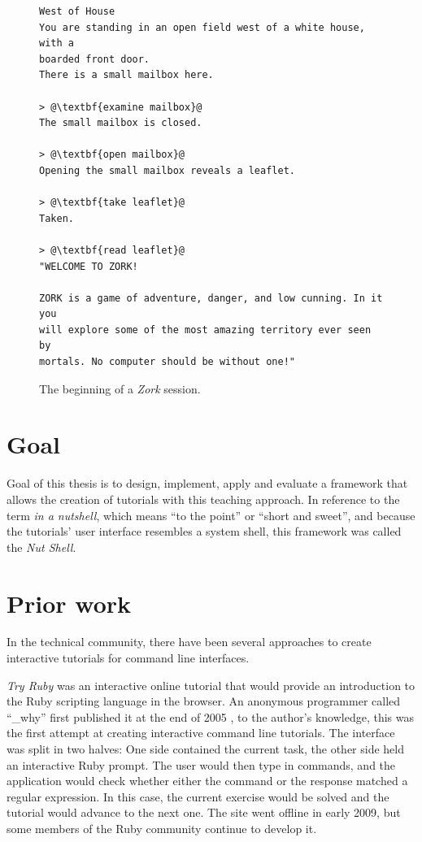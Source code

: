 \documentclass[paper=a4,twoside,abstract=on,cleardoublepage=empty,numbers=noenddot,toc=bib,12pt,appendixprefix=true]{scrreprt}
\begin{document}
\begin{figure}[tb]
    \begin{lstlisting}[escapechar=@,frame=shadowbox]
West of House
You are standing in an open field west of a white house, with a
boarded front door.
There is a small mailbox here.

> @\textbf{examine mailbox}@
The small mailbox is closed.

> @\textbf{open mailbox}@
Opening the small mailbox reveals a leaflet.

> @\textbf{take leaflet}@
Taken.

> @\textbf{read leaflet}@
"WELCOME TO ZORK!

ZORK is a game of adventure, danger, and low cunning. In it you
will explore some of the most amazing territory ever seen by
mortals. No computer should be without one!"
    \end{lstlisting}
    \centering
    \caption{The beginning of a \emph{Zork} session.}
    \label{fig:zork}
\end{figure}

\section{Goal}

Goal of this thesis is to design, implement, apply and evaluate a framework that allows the creation of tutorials with this teaching approach. In reference to the term \emph{in a nutshell}, which means “to the point” or “short and sweet”, and because the tutorials' user interface resembles a system shell, this framework was called the \emph{Nut Shell}.

\section{Prior work}

In the technical community, there have been several approaches to create interactive tutorials for command line interfaces.

\emph{Try Ruby} was an interactive online tutorial that would provide an introduction to the Ruby scripting language in the browser. An anonymous programmer called “\_why” first published it at the end of 2005 \cite{why05}, to the author's knowledge, this was the first attempt at creating interactive command line tutorials. The interface was split in two halves: One side contained the current task, the other side held an interactive Ruby prompt. The user would then type in commands, and the application would check whether either the command or the response matched a regular expression. In this case, the current exercise would be solved and the tutorial would advance to the next one.
The site went offline in early 2009, but some members of the Ruby community continue to develop it.
\end{document}
